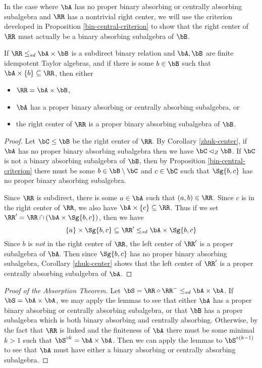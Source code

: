 In the case where $\bA$ has no proper binary absorbing or centrally absorbing subalgebra and $\RR$ has a nontrivial right center, we will use the criterion developed in Proposition \ref{bin-central-criterion} to show that the right center of $\RR$ must actually be a binary absorbing subalgebra of $\bB$.

\begin{lem} If $\RR \le_{sd} \bA \times \bB$ is a subdirect binary relation and $\bA,\bB$ are finite idempotent Taylor algebras, and if there is some $b \in \bB$ such that $\bA \times \{b\} \subseteq \RR$, then either
\begin{itemize}
\item $\RR = \bA \times \bB$,
\item $\bA$ has a proper binary absorbing or centrally absorbing subalgebra, or
\item the right center of $\RR$ is a proper binary absorbing subalgebra of $\bB$.
\end{itemize}
\end{lem}
\begin{proof} Let $\bC \le \bB$ be the right center of $\RR$. By Corollary \ref{zhuk-center}, if $\bA$ has no proper binary absorbing subalgebra then we have $\bC \lhd_Z \bB$. If $\bC$ is not a binary absorbing subalgebra of $\bB$, then by Proposition \ref{bin-central-criterion} there must be some $b \in \bB\setminus \bC$ and $c \in \bC$ such that $\Sg\{b,c\}$ has no proper binary absorbing subalgebra.

Since $\RR$ is subdirect, there is some $a \in \bA$ such that $(a,b) \in \RR$. Since $c$ is in the right center of $\RR$, we also have $\bA \times \{c\} \subseteq \RR$. Thus if we set $\RR' = \RR \cap (\bA \times \Sg\{b,c\})$, then we have
\[
\{a\} \times \Sg\{b,c\} \subseteq \RR' \le_{sd} \bA \times \Sg\{b,c\}
\]
Since $b$ is \emph{not} in the right center of $\RR$, the left center of $\RR'$ is a proper subalgebra of $\bA$. Then since $\Sg\{b,c\}$ has no proper binary absorbing subalgebra, Corollary \ref{zhuk-center} shows that the left center of $\RR'$ is a proper centrally absorbing subalgebra of $\bA$.
\end{proof}

\begin{proof}[Proof of the Absorption Theorem] Let $\bS = \RR \circ \RR^- \le_{sd} \bA \times \bA$. If $\bS = \bA \times \bA$, we may apply the lemmas to see that either $\bA$ has a proper binary absorbing or centrally absorbing subalgebra, or that $\bB$ has a proper subalgebra which is both binary absorbing and centrally absorbing. Otherwise, by the fact that $\RR$ is linked and the finiteness of $\bA$ there must be some minimal $k > 1$ such that $\bS^{\circ k} = \bA\times \bA$. Then we can apply the lemmas to $\bS^{\circ(k-1)}$ to see that $\bA$ must have either a binary absorbing or centrally absorbing subalgebra.
\end{proof}

